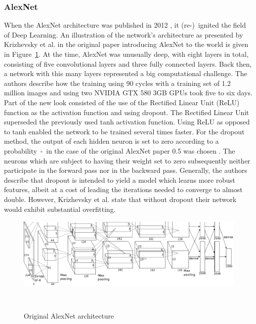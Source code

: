 \subsubsection{AlexNet}\label{alexnet}
When the AlexNet architecture was published in 2012 \citep{AlexNetoriginal}, it (re-)~ignited the field of Deep Learning. An illustration of the network's architecture as presented by Krizhevsky et al\@. in the original paper introducing AlexNet to the world is given in Figure~\ref{fig:alexnet}. At the time, AlexNet was unusually deep, with eight layers in total, consisting of five convolutional layers and three fully connected layers. Back then, a network with this many layers represented a big computational challenge. The authors describe how the training using 90 cycles with a training set of 1.2 million images and using two NVIDIA GTX 580 3GB GPUs took five to six days. Part of the new look consisted of the use of the Rectified Linear Unit (ReLU) function as the activation function and using dropout. The Rectified Linear Unit superseded the previously used tanh activation function. Using ReLU as opposed to tanh enabled the network to be trained several times faster. For the dropout method, the output of each hidden neuron is set to zero according to a probability~-~in the case of the original AlexNet paper 0.5 was chosen \citep{AlexNetoriginal}. The neurons which are subject to having their weight set to zero subsequently neither participate in the forward pass nor in the backward pass. Generally, the authors describe that dropout is intended to yield a model which learns more robust features, albeit at a cost of leading the iterations needed to converge to almost double. However, Krizhevsky et al\@. state that without dropout their network would exhibit substantial overfitting.
\begin{figure}[h]
	\centering
	\includegraphics[scale=0.4]{./figures/AlexNet-architecture.png}
	\caption{Original AlexNet architecture}~\label{fig:alexnet}
\end{figure}

